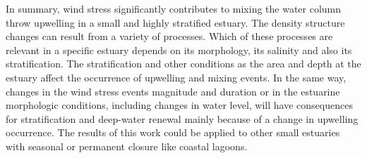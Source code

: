 \documentclass[tesis.tex]{subfiles}
\begin{document}
In summary, wind stress significantly contributes to mixing the water column throw upwelling in a small and highly stratified estuary. The density structure changes can result from a variety of processes. Which of these processes are relevant in a specific estuary depends on its morphology, its salinity and also its stratification. The stratification and other conditions as the area and depth at the estuary affect the occurrence of upwelling and mixing events. In the same way, changes in the wind stress events magnitude and duration or in the estuarine morphologic conditions, including changes in water level, will have consequences for stratification and deep-water renewal mainly because of a change in upwelling occurrence. The results of this work could be applied to other small estuaries with seasonal or permanent closure like coastal lagoons.\\
\end{document}
